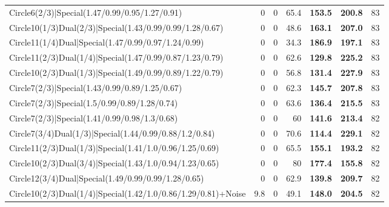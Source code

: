 \begin{tabular}{lrrrllr}
 Circle6(2/3)|Special(1.47/0.99/0.95/1.27/0.91)                 &          0   &            0   &          65.4 & \textbf{153.5} & \textbf{200.8} &           83 \\
 Circle10(1/3)Dual(2/3)|Special(1.43/0.99/0.99/1.28/0.67)       &          0   &            0   &          48.6 & \textbf{163.1} & \textbf{207.0} &           83 \\
 Circle11(1/4)Dual|Special(1.47/0.99/0.97/1.24/0.99)            &          0   &            0   &          34.3 & \textbf{186.9} & \textbf{197.1} &           83 \\
 Circle11(2/3)Dual(1/4)|Special(1.47/0.99/0.87/1.23/0.79)       &          0   &            0   &          62.6 & \textbf{129.8} & \textbf{225.2} &           83 \\
 Circle10(2/3)Dual(1/3)|Special(1.49/0.99/0.89/1.22/0.79)       &          0   &            0   &          56.8 & \textbf{131.4} & \textbf{227.9} &           83 \\
 Circle7(2/3)|Special(1.43/0.99/0.89/1.25/0.67)                 &          0   &            0   &          62.3 & \textbf{145.7} & \textbf{207.8} &           83 \\
 Circle7(2/3)|Special(1.5/0.99/0.89/1.28/0.74)                  &          0   &            0   &          63.6 & \textbf{136.4} & \textbf{215.5} &           83 \\
 Circle7(2/3)|Special(1.41/0.99/0.98/1.3/0.68)                  &          0   &            0   &          60   & \textbf{141.6} & \textbf{213.4} &           82 \\
 Circle7(3/4)Dual(1/3)|Special(1.44/0.99/0.88/1.2/0.84)         &          0   &            0   &          70.6 & \textbf{114.4} & \textbf{229.1} &           82 \\
 Circle11(2/3)Dual(1/3)|Special(1.41/1.0/0.96/1.25/0.69)        &          0   &            0   &          65.5 & \textbf{155.1} & \textbf{193.2} &           82 \\
 Circle10(2/3)Dual(3/4)|Special(1.43/1.0/0.94/1.23/0.65)        &          0   &            0   &          80   & \textbf{177.4} & \textbf{155.8} &           82 \\
 Circle12(3/4)Dual|Special(1.49/0.99/0.99/1.28/0.65)            &          0   &            0   &          62.9 & \textbf{139.8} & \textbf{209.7} &           82 \\
 Circle10(2/3)Dual(1/4)|Special(1.42/1.0/0.86/1.29/0.81)+Noise  &          9.8 &            0   &          49.1 & \textbf{148.0} & \textbf{204.5} &           82 \\

\end{tabular}
